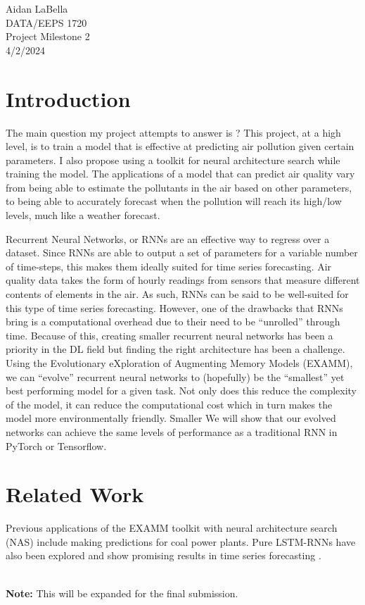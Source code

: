 \documentclass[12pt]{article}
\begin{document}
\noindent
Aidan LaBella \\
DATA/EEPS 1720 \\
Project Milestone 2\\
4/2/2024 \\

\section{Introduction}
\indent
The main question my project attempts to answer is ? This project, at a high level, is to train a model that is effective at predicting air pollution given certain parameters. I also propose using a toolkit for neural architecture search while training the model. The applications of a model that can predict air quality vary from being able to estimate the pollutants in the air based on other parameters, to being able to accurately forecast when the pollution will reach its high/low levels, much like a weather forecast. 

Recurrent Neural Networks, or RNNs are an effective way to regress over a dataset. Since RNNs are able to output a set of parameters for a variable number of time-steps, this makes them ideally suited for time series forecasting. Air quality data takes the form of hourly readings from sensors that measure different contents of elements in the air. As such, RNNs can be said to be well-suited for this type of time series forecasting. However, one of the drawbacks that RNNs bring is a computational overhead due to their need to be “unrolled” through time. Because of this, creating smaller recurrent neural networks has been a priority in the DL field but finding the right architecture has been a challenge. Using the Evolutionary eXploration of Augmenting Memory Models (EXAMM)\cite{ororbia_investigating_2019}, we can “evolve'' recurrent neural networks to (hopefully) be the “smallest” yet best performing model for a given task. Not only does this reduce the complexity of the model, it can reduce the computational cost which in turn makes the model more environmentally friendly. Smaller We will show that our evolved networks can achieve the same levels of performance as a traditional RNN in PyTorch or Tensorflow.

\section{Related Work}
\indent
Previous applications of the EXAMM\cite{ororbia_investigating_2019} toolkit with neural architecture search (NAS) include making predictions for coal power plants\cite{kaufmann_evolving_2019}. Pure LSTM-RNNs have also been explored and show promising results in time series forecasting \cite{belavadi2020air}.\\
\\
\begin{footnotesize}
    \textbf{Note:} This will be expanded for the final submission.
\end{footnotesize}
\end{document}

